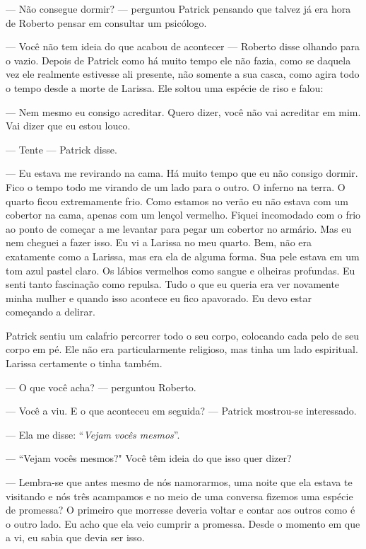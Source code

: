 --- Não consegue dormir? --- perguntou Patrick\mudanca{,} pensando que talvez já era hora de Roberto pensar em consultar um psicólogo.

--- Você não tem ideia do que acabou de acontecer --- Roberto disse\mudanca{,} olhando para o vazio. Depois de Patrick como há muito tempo ele não fazia, como se daquela vez ele realmente estivesse ali presente, não somente a sua casca, como agira todo o tempo desde a morte de Larissa. Ele soltou uma espécie de riso e falou:

--- Nem mesmo eu consigo acreditar. Quero dizer, você não vai acreditar em mim. Vai dizer que eu estou louco.

--- Tente --- Patrick disse.

--- Eu estava me revirando na cama. Há muito tempo que eu não consigo dormir. Fico o tempo todo me virando de um lado para o outro. O inferno na terra. O quarto ficou extremamente frio. Como estamos no verão eu não estava com um cobertor na cama, apenas com um lençol vermelho. Fiquei incomodado com o frio ao ponto de começar a me levantar para pegar um cobertor no armário. Mas eu nem cheguei a fazer isso. Eu vi a Larissa no meu quarto. Bem, não era exatamente como a Larissa, mas era ela de alguma forma. Sua pele estava em um tom azul pastel claro. Os lábios vermelhos como sangue e olheiras profundas. Eu senti tanto fascinação como repulsa. Tudo o que eu queria era ver novamente minha mulher e quando isso acontece eu fico apavorado. Eu devo estar começando a delirar.

Patrick sentiu um calafrio percorrer todo o seu corpo, colocando cada pelo de seu corpo em pé. Ele não era particularmente religioso, mas tinha um lado espiritual. Larissa certamente o tinha também.

--- O que você acha? --- perguntou Roberto.

--- Você a viu. E o que aconteceu em seguida? --- Patrick mostrou-se interessado.

--- Ela me disse: ``\emph{Vejam vocês mesmos}''.

--- ``Vejam vocês mesmos?" Você têm ideia do que isso quer dizer?

--- Lembra-se que antes mesmo de nós namorarmos, uma noite que ela estava te visitando e nós três acampamos e no meio de uma conversa fizemos uma espécie de promessa? O primeiro que morresse deveria voltar e contar aos outros como é o outro lado. Eu acho que ela veio cumprir a promessa. Desde o momento em que a vi, eu sabia que devia ser isso.

